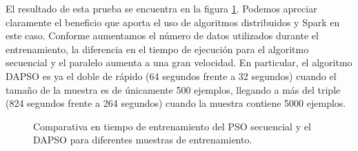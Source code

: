 \vspace{10pt}
El resultado de esta prueba se encuentra en la figura \ref{fig:comp-tiempo-dd}. Podemos apreciar claramente el beneficio 
que aporta el uso de algoritmos distribuidos y Spark en este caso. Conforme aumentamos el número de datos utilizados 
durante el entrenamiento, la diferencia en el tiempo de ejecución para el algoritmo secuencial y el paralelo aumenta a 
una gran velocidad. En particular, el algoritmo DAPSO es ya el doble de rápido (64 segundos frente a 32 segundos) cuando
el tamaño de la muestra es de únicamente 500 ejemplos, llegando a más del triple (824 segundos frente a 264 segundos) 
cuando la muestra contiene 5000 ejemplos.

\begin{figure}[ht!]
\begin{minipage}[c]{.5\textwidth}
\raggedright
{}
\end{minipage}%
\begin{minipage}[c]{.5\textwidth}
\end{minipage}
    \caption{Comparativa en tiempo de entrenamiento del PSO secuencial y el DAPSO para diferentes muestras de entrenamiento.}
    \label{fig:comp-tiempo-dd}
\end{figure}

